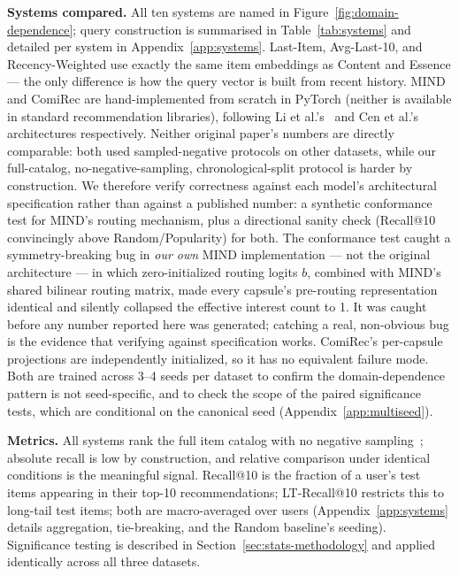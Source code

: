 \documentclass{article}
\begin{document}
\textbf{Systems compared.} All ten systems are named in Figure~\ref{fig:domain-dependence}; query construction is summarised in Table~\ref{tab:systems} and detailed per system in Appendix~\ref{app:systems}. Last-Item, Avg-Last-10, and Recency-Weighted use exactly the same item embeddings as Content and Essence --- the only difference is how the query vector is built from recent history. MIND and ComiRec are hand-implemented from scratch in PyTorch (neither is available in standard recommendation libraries), following Li et al.'s~\cite{li2019} and Cen et al.'s~\cite{cen2020} architectures respectively. Neither original paper's numbers are directly comparable: both used sampled-negative protocols on other datasets, while our full-catalog, no-negative-sampling, chronological-split protocol is harder by construction. We therefore verify correctness against each model's architectural specification rather than against a published number: a synthetic conformance test for MIND's routing mechanism, plus a directional sanity check (Recall@10 convincingly above Random/Popularity) for both. The conformance test caught a symmetry-breaking bug in \emph{our own} MIND implementation --- not the original architecture --- in which zero-initialized routing logits $b$, combined with MIND's shared bilinear routing matrix, made every capsule's pre-routing representation identical and silently collapsed the effective interest count to 1. It was caught before any number reported here was generated; catching a real, non-obvious bug is the evidence that verifying against specification works. ComiRec's per-capsule projections are independently initialized, so it has no equivalent failure mode. Both are trained across 3--4 seeds per dataset to confirm the domain-dependence pattern is not seed-specific, and to check the scope of the paired significance tests, which are conditional on the canonical seed (Appendix~\ref{app:multiseed}).

\textbf{Metrics.} All systems rank the full item catalog with no negative sampling~\cite{krichene2020,rendle2019}; absolute recall is low by construction, and relative comparison under identical conditions is the meaningful signal. Recall@10 is the fraction of a user's test items appearing in their top-10 recommendations; LT-Recall@10 restricts this to long-tail test items; both are macro-averaged over users (Appendix~\ref{app:systems} details aggregation, tie-breaking, and the Random baseline's seeding). Significance testing is described in Section~\ref{sec:stats-methodology} and applied identically across all three datasets.
\end{document}
